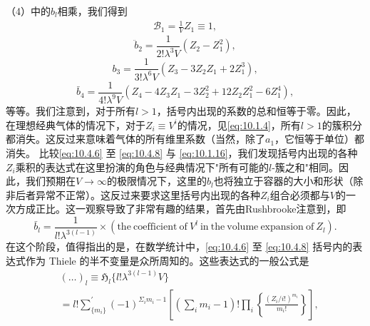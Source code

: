（4）中的\(b_{l}\)相乘，我们得到
\begin{equation}\tag{10.4.4}\label{eq:10.4.4}
\begin{array}{r} { \mathcal { B } _ { 1 } = \frac { 1 } { V } Z _ { 1 } \equiv 1 , } \end{array}
\end{equation}
\begin{equation}\tag{10.4.5}\label{eq:10.4.5}
\ddot { b } _ { 2 } = \frac { 1 } { 2 ! \lambda ^{3} V } ( Z _ { 2 } - Z _ { 1 } ^{2} ) ,
\end{equation}
\begin{equation}\tag{10.4.6}\label{eq:10.4.6}
b _ { 3 } = \frac { 1 } { 3 ! \lambda ^{6} V } ( Z _ { 3 } - 3 Z _ { 2 } Z _ { 1 } + 2 Z _ { 1 } ^{3} ) ,
\end{equation}
\begin{equation}\tag{10.4.7}\label{eq:10.4.7}
\bar { b } _ { 4 } = \frac { 1 } { 4 ! \lambda ^{9} V } ( Z _ { 4 } - 4 Z _ { 3 } Z _ { 1 } - 3 Z _ { 2 } ^{2} + 12 Z _ { 2 } Z _ { 1 } ^{2} - 6 Z _ { 1 } ^{4} ) ,
\end{equation}
等等。我们注意到，对于所有\(l > 1\)，括号内出现的系数的总和恒等于零。因此，在理想经典气体的情况下，对于\(Z_i \equiv V^i\)的情况，见\autoref{eq:10.1.4}，所有\(l > 1\)的簇积分都消失。这反过来意味着气体的所有维里系数（当然，除了\(a_1\)，它恒等于单位）都消失。
比较\autoref{eq:10.4.6} 至 \autoref{eq:10.4.8} 与 \autoref{eq:10.1.16}，我们发现括号内出现的各种\(Z_i\)乘积的表达式在这里扮演的角色与经典情况下"所有可能的\(l\)-簇之和"相同。因此，我们预期在\(V \to \infty\)的极限情况下，这里的\(b_l\)也将独立于容器的大小和形状（除非后者异常不正常）。这反过来要求这里括号内出现的各种\(Z_i\)组合必须都与\(V\)的一次方成正比。这一观察导致了非常有趣的结果，首先由Rushbrooke注意到，即
\begin{equation}\tag{10.4.8}\label{eq:10.4.8}
\bar { b } _ { l } = \frac { 1 } { l ! \lambda ^{3 ( l - 1 )} } \times ( \mathrm { t h e ~ c o e f f i c i e n t ~ o f ~ } V ^{l} \mathrm { ~ i n ~ t h e ~ v o l u m e ~ e x p a n s i o n ~ o f ~ } Z _ { l } ) .
\end{equation}
在这个阶段，值得指出的是，在数学统计中，\autoref{eq:10.4.6} 至 \autoref{eq:10.4.8} 括号内的表达式作为 Thiele 的半不变量是众所周知的。这些表达式的一般公式是
\begin{equation}\tag{10.4.9}\label{eq:10.4.9}
\begin{array}{rl} & { ( \ldots ) _ { l } \equiv \mathfrak { H } _ { l } \{ l ! \lambda ^{3 ( l - 1 )} V \} } \\& {  = l ! \sum _ { \{ m _ { i } \} } ^{\prime} ( - 1 ) ^{\Sigma _ { i} m _ { i } - 1 } \left[ \left( \sum _ { i } m _ { i } - 1 \right) ! \prod _ { i } \left\{ \frac { ( Z _ { i } / i ! ) ^{m _ { i} } } { m _ { i } ! } \right\} \right] , } \end{array}
\end{equation}
